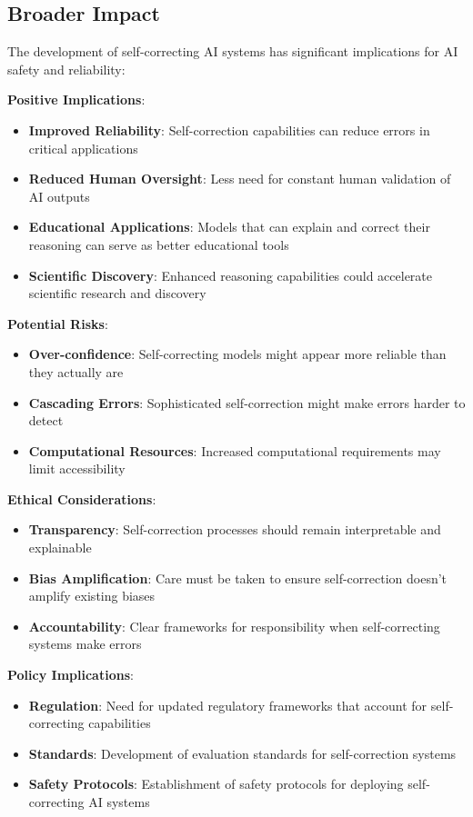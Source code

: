 \documentclass[10pt,twocolumn]{article}
\begin{document}
\subsection{Broader Impact}

The development of self-correcting AI systems has significant implications for AI safety and reliability:

\textbf{Positive Implications}:
\begin{itemize}
\item \textbf{Improved Reliability}: Self-correction capabilities can reduce errors in critical applications
\item \textbf{Reduced Human Oversight}: Less need for constant human validation of AI outputs
\item \textbf{Educational Applications}: Models that can explain and correct their reasoning can serve as better educational tools
\item \textbf{Scientific Discovery}: Enhanced reasoning capabilities could accelerate scientific research and discovery
\end{itemize}

\textbf{Potential Risks}:
\begin{itemize}
\item \textbf{Over-confidence}: Self-correcting models might appear more reliable than they actually are
\item \textbf{Cascading Errors}: Sophisticated self-correction might make errors harder to detect
\item \textbf{Computational Resources}: Increased computational requirements may limit accessibility
\end{itemize}

\textbf{Ethical Considerations}:
\begin{itemize}
\item \textbf{Transparency}: Self-correction processes should remain interpretable and explainable
\item \textbf{Bias Amplification}: Care must be taken to ensure self-correction doesn't amplify existing biases
\item \textbf{Accountability}: Clear frameworks for responsibility when self-correcting systems make errors
\end{itemize}

\textbf{Policy Implications}:
\begin{itemize}
\item \textbf{Regulation}: Need for updated regulatory frameworks that account for self-correcting capabilities
\item \textbf{Standards}: Development of evaluation standards for self-correction systems
\item \textbf{Safety Protocols}: Establishment of safety protocols for deploying self-correcting AI systems
\end{itemize}
\end{document}
